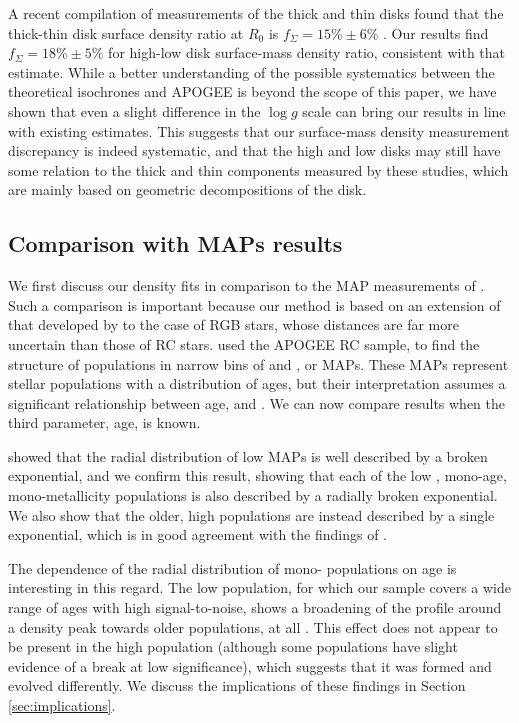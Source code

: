 A recent compilation of measurements of the thick and thin disks found that the thick-thin disk surface density ratio at $R_0$ is $f_{\Sigma} = 15\% \pm 6\%$ \citep{2016ARA&A..54..529B}. Our results find $f_{\Sigma} = 18\% \pm 5\%$ for high-low \afe{} disk surface-mass density ratio, consistent with that estimate. While a better understanding of the possible systematics between the theoretical isochrones and APOGEE is beyond the scope of this paper, we have shown that even a slight difference in the $\log{g}$ scale can bring our results in line with existing estimates. This suggests that our surface-mass density measurement discrepancy is indeed systematic, and that the high and low \afe{} disks may still have some relation to the thick and thin components measured by these studies, which are mainly based on geometric decompositions of the disk. 

\subsection{Comparison with MAPs results}
\label{sec:bovycomparison}
We first discuss our density fits in comparison to the MAP measurements of \citet{2012ApJ...753..148B,2016ApJ...823...30B}. Such a comparison is important because our method is based on an extension of that developed by \citet{2016ApJ...823...30B} to the case of RGB stars, whose distances are far more uncertain than those of RC stars. \citet{2016ApJ...823...30B} used the APOGEE RC sample, to find the structure of populations in narrow bins of \afe{} and \feh{}, or MAPs. These MAPs represent stellar populations with a distribution of ages, but their interpretation assumes a significant relationship between age, \afe{} and \feh{}. We can now compare results when the third parameter, age, is known.  

\citet{2016ApJ...823...30B} showed that the radial distribution of low \afe{} MAPs is well described by a broken exponential, and we confirm this result, showing that each of the low \afe{}, mono-age, mono-metallicity populations is also described by a radially broken exponential. We also show that the older, high \afe{} populations are instead described by a single exponential, which is in good agreement with the findings of \citet{2016ApJ...823...30B}.

The dependence of the radial distribution of mono-\feh{} populations on age is interesting in this regard.  The low \afe{} population, for which our sample covers a wide range of ages with high signal-to-noise, shows a broadening of the profile around a density peak towards older populations, at all \feh{}. This effect does not appear to be present in the high \afe{} population (although some populations have slight evidence of a break at low significance), which suggests that it was formed and evolved differently. We discuss the implications of these findings in Section \ref{sec:implications}.

